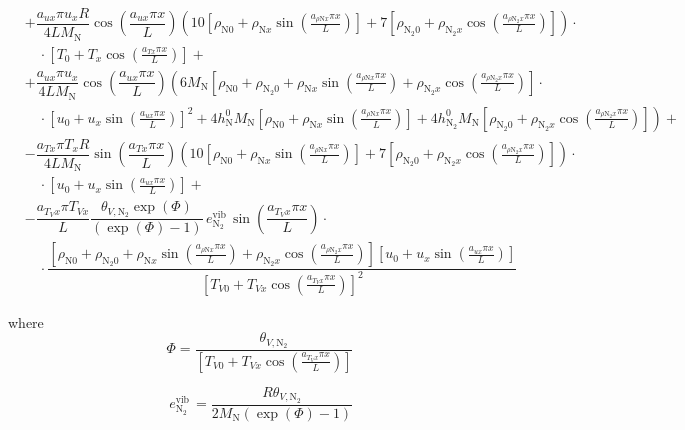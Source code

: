 \documentclass[10pt]{article}
\begin{document}
\begin{equation}
\begin{split}
&+ \dfrac{ a_{ux} \pi u_x R}{4L M_\text{N}}\cos\left(\dfrac{a_{ux} \pi x}{L}\right)\left(10 \left[\rho_{\text{N}0} + \rho_{\text{N}x} \sin\left(\frac{a_{\rho \text{N} x}\pi x}{L}\right)\right]+7 \left[\rho_{\text{N}_2 0}+ \rho_{\text{N}_2 x} \cos\left(\frac{a_{ \rho \text{N}_2 x } \pi x}{L}\right)\right]\right)\cdot \\
    &\quad \cdot \left[T_{0}+T_{x} \cos\left(\frac{a_{T x} \pi x}{L}\right)\right]+\\
%
&+ \dfrac{a_{ux} \pi u_x}{4L M_\text{N}} \cos\left(\dfrac{a_{ux} \pi x}{L}\right)\left(6 M_\text{N} \left[\rho_{\text{N}0} + \rho_{\text{N}_2 0} + \rho_{\text{N}x} \sin\left(\frac{a_{  \rho \text{N} x }\pi x}{L}\right) + \rho_{\text{N}_2 x} \cos\left(\frac{a_{ \rho \text{N}_2 x } \pi x}{L}\right)\right] \right.\cdot \\
    &\quad \cdot \left. \left[u_{0}+u_{x} \sin\left(\frac{a_{u x} \pi x}{L}\right)\right]^2 +4 h^{0}_{\text{N}} M_\text{N} \left[\rho_{\text{N}0} + \rho_{\text{N}x} \sin\left(\frac{a_{\rho \text{N} x}\pi x}{L}\right)\right]+4 h^{0}_{\text{N}_2} M_\text{N} \left[\rho_{\text{N}_2 0}+ \rho_{\text{N}_2 x} \cos\left(\frac{a_{ \rho \text{N}_2 x } \pi x}{L}\right)\right]\right) +\\
&-\dfrac{a_{Tx} \pi T_x R }{4L M_\text{N}}\sin\left(\dfrac{a_{Tx} \pi x}{L}\right)\left(10 \left[\rho_{\text{N}0} + \rho_{\text{N}x} \sin\left(\frac{a_{\rho \text{N} x}\pi x}{L}\right)\right]+7 \left[\rho_{\text{N}_2 0}+ \rho_{\text{N}_2 x} \cos\left(\frac{a_{ \rho \text{N}_2 x } \pi x}{L}\right)\right]\right)\cdot \\
    &\quad \cdot   \left[u_{0}+u_{x} \sin\left(\frac{a_{u x} \pi x}{L}\right)\right]+\\
&- \dfrac{ a_{T_V x} \pi T_{Vx}}{L} \dfrac{\theta_{V,\text{N}_2}\exp(\Phi)}{\left( \exp(\Phi) -1 \right)}  \, e^{\text{vib}}_{\text{N}_2}\,\sin\left(\dfrac{a_{T_V x} \pi x}{L}\right)\cdot \\
    &\quad \cdot  \dfrac{\left[\rho_{\text{N}0} + \rho_{\text{N}_2 0} + \rho_{\text{N}x} \sin\left(\frac{a_{  \rho \text{N} x }\pi x}{L}\right) + \rho_{\text{N}_2 x} \cos\left(\frac{a_{ \rho \text{N}_2 x } \pi x}{L}\right)\right]  \left[u_{0}+u_{x} \sin\left(\frac{a_{u x} \pi x}{L}\right)\right]}{ \left[T_{V0}+T_{Vx} \cos\left(\frac{a_{T_V x} \pi x}{L}\right)\right]^2}
\end{split}
\end{equation}


where
$$\Phi= \dfrac{\theta_{V,\text{N}_2}}{ \left[T_{V0}+T_{Vx} \cos\left(\frac{a_{T_V x} \pi x}{L}\right)\right]}$$

 $$ \, e^{\text{vib}}_{\text{N}_2}\, =\dfrac{R \theta_{V,\text{N}_2}}{2 M_\text{N} \left( \exp(\Phi) -1 \right)}$$



%
 

\end{document}
